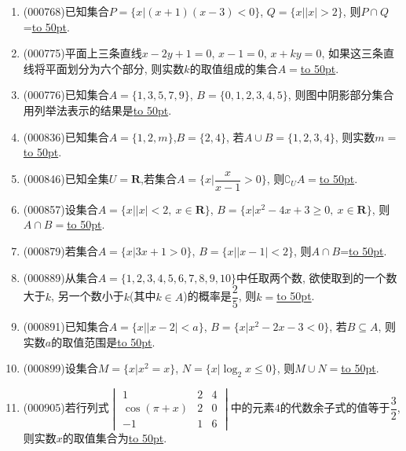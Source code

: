 \documentclass[10pt,a4paper]{article}
\newcommand{\blank}[1]{\underline{\hbox to #1pt{}}}
\begin{document}
\begin{enumerate}[1.]
\item {\tiny (000768)}已知集合$P=\{x|(x+1)(x-3)<0\}$, $Q=\{x||x|>2\}$, 则$P\cap Q$=\blank{50}.
\item {\tiny (000775)}平面上三条直线$x-2y+1=0$, $x-1=0$, $x+ky=0$, 如果这三条直线将平面划分为六个部分, 则实数$k$的取值组成的集合$A=$\blank{50}.
\item {\tiny (000776)}已知集合$A=\{1,3,5,7,9\}$, $B=\{0,1,2,3,4,5\}$, 则图中阴影部分集合用列举法表示的结果是\blank{50}.
\begin{center}
\end{center}
\item {\tiny (000836)}已知集合$A=\{1,2,m\}$,$B=\{2,4\}$, 若$A\cup B=\{1,2,3,4\}$, 则实数$m=$\blank{50}.
\item {\tiny (000846)}已知全集$U=\mathbf{R}$,若集合$A=\{x|\dfrac x{x-1}>0\}$, 则$\complement_U A=$\blank{50}.
\item {\tiny (000857)}设集合$A=\{x||x|<2,\ x\in \mathbf{R}\}$, $B=\{x|x^2-4x+3\ge 0, \ x\in \mathbf{R}\}$, 则$A\cap B=$\blank{50}.
\item {\tiny (000879)}若集合$A=\{x|3x+1>0\}$, $B=\{x||x-1|<2\}$, 则$A\cap B$=\blank{50}.
\item {\tiny (000889)}从集合$A=\{1,2,3,4,5,6,7,8,9,10\}$中任取两个数, 欲使取到的一个数大于$k$, 另一个数小于$k$(其中$k\in A$)的概率是$\dfrac25$, 则$k=$\blank{50}.
\item {\tiny (000891)}已知集合$A=\{x||x-2|<a\}$, $B=\{x|x^2-2x-3<0\}$, 若$B\subseteq A$, 则实数$a$的取值范围是\blank{50}.
\item {\tiny (000899)}设集合$M=\{x|x^2=x\}$, $N=\{x|\log_2 x\le 0\}$, 则$M\cup N=$\blank{50}.
\item {\tiny (000905)}若行列式$\begin{vmatrix}   1 & 2 & 4 \\   \cos (\pi +x) & 2 & 0 \\   -1 & 1 & 6 \end{vmatrix}$中的元素$4$的代数余子式的值等于$\dfrac32$, 则实数$x$的取值集合为\blank{50}.

\end{enumerate}
\end{document}
